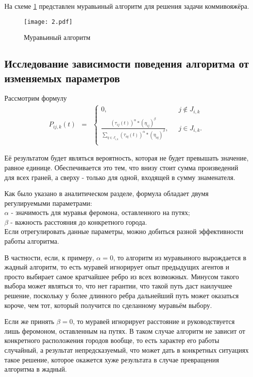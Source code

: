 \documentclass[12pt,a4paper]{scrartcl}
\begin{document}
На схеме \ref{graph2.5} представлен муравьиный алгоритм для решения задачи коммивояжёра.

\begin{figure}[h!]
	\centering
	\texttt{[image: 2.pdf]}
	\caption{Муравьиный алгоритм}
	\label{graph2.5}
\end{figure}

\subsection{Исследование зависимости поведения алгоритма от изменяемых параметров}

Рассмотрим формулу
\begin{equation*}
\begin{matrix}
P_{ij,k}(t) & = 
& \left\{
\begin{matrix}
0, & \mbox{ } j \notin J_{i,k} \\
\frac {(τ_{ij}(t))^\alpha * (η_{ij})^\beta} {\sum \limits_{q \in J_{i,k}} (τ_{iq}(t))^\alpha * (η_{iq})^\beta}, & \mbox{ } j \in J_{i,k}. \\
\end{matrix} \right.
\end{matrix}
\end{equation*}

Её результатом будет являться вероятность, которая не будет превышать значение, равное единице. Обеспечивается это тем, что внизу стоит сумма произведений для всех граней, а сверху - только для одной, входящей в сумму знаменателя.

Как было указано в аналитическом разделе, формула обладает двумя регулируемыми параметрами:\\
$\alpha$ - значимость для муравья феромона, оставленного на путях; \\
$\beta$ - важность расстояния до конкретного города.\\
Если отрегулировать данные параметры, можно добиться разной эффективности работы алгоритма. 

В частности, если, к примеру, $\alpha = 0$, то алгоритм из муравьиного вырождается в жадный алгоритм, то есть муравей игнорирует опыт предыдущих агентов и просто выбирает самое кратчайшее ребро из всех возможных. Минусом такого выбора может являться то, что нет гарантии, что такой путь даст наилучшее решение, поскольку у более длинного ребра дальнейший путь может оказаться короче, чем тот, который получится по сделанному муравьём выбору.

Если же принять $\beta = 0$, то муравей игнорирует расстояние и руководствуется лишь феромоном, оставленным на путях. В таком случае алгоритм не зависит от конкретного расположения городов вообще, то есть характер его работы случайный, а результат непредсказуемый, что может дать в конкретных ситуациях такое решение, которое окажется хуже результата в случае превращения алгоритма в жадный.
\end{document}
